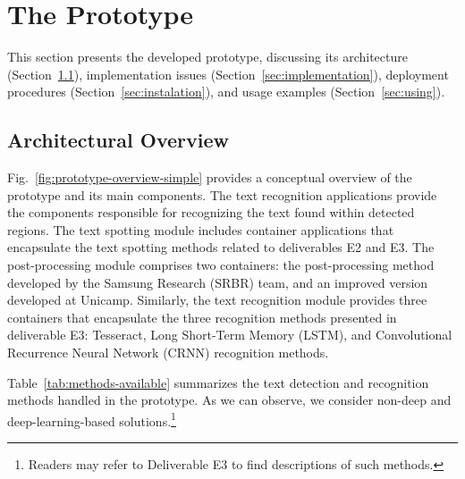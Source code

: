 
\section{The Prototype}
\label{sec:overview}

This section presents the developed prototype, discussing its architecture (Section~\ref{sec:architecture}), implementation issues (Section~\ref{sec:implementation}), deployment procedures (Section~\ref{sec:instalation}), and usage examples (Section~\ref{sec:using}).

\subsection{Architectural Overview}
\label{sec:architecture}

Fig.~\ref{fig:prototype-overview-simple} provides a conceptual overview of the prototype and its main components.
The text recognition applications provide the components responsible for recognizing the text found within detected regions. The text spotting module includes container applications that encapsulate the text spotting methods related to deliverables E2 and E3. The post-processing module comprises two containers: the post-processing method developed by the Samsung Research (SRBR) team, and an improved version developed at Unicamp. Similarly, the text recognition module provides three containers that encapsulate the three recognition methods presented in deliverable E3: Tesseract, Long Short-Term Memory (LSTM), and Convolutional Recurrence Neural Network (CRNN) recognition methods.

Table~\ref{tab:methods-available} summarizes the text detection and recognition methods handled in the prototype. As we can observe, we consider non-deep and deep-learning-based solutions.\footnote{Readers may refer to Deliverable E3 to find descriptions of such methods.}

